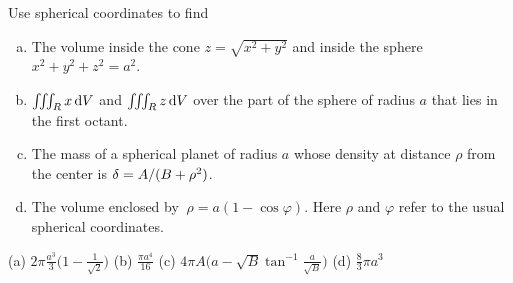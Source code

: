 \begin{question}
Use spherical coordinates to find
\begin{enumerate}[(a)]
\item 
The volume inside the cone $z=\sqrt{x^2+y^2}$ and inside the sphere
$x^2+y^2+z^2=a^2$.
\item 
$\iiint_R x\, \mathrm{d}V$ and $\iiint_R z\, \mathrm{d}V$ over the
part of the sphere of radius $a$ that lies in the first octant.
\item
The mass of a spherical planet of radius $a$ whose density at
distance $\rho$ from the center is $\delta=A/(B+\rho^2)$. 
\item
The volume enclosed by $\ \rho=a(1-\cos\varphi).$ Here $\rho$ and $\varphi$ 
refer to the usual spherical coordinates.
\end{enumerate}
\end{question}

%

\begin{answer}
(a) $2\pi\frac{a^3}{3}\big(1-\frac{1}{\sqrt{2}}\big)$\qquad
(b) $\frac{\pi a^4}{16}$\qquad
(c) $4\pi A\big(a-\sqrt{B}\tan^{-1}\frac{a}{\sqrt{B}}\big)$\qquad
(d) $\frac{8}{3}\pi a^3$
\end{answer}

